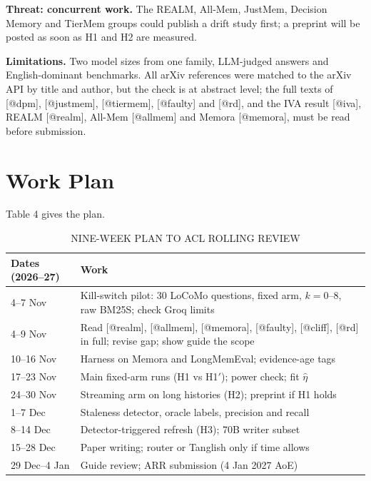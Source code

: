 \textbf{Threat: concurrent work.} The REALM, All-Mem, JustMem, Decision Memory and TierMem groups could publish a drift study first; a preprint will be posted as soon as H1 and H2 are measured.

\textbf{Limitations.} Two model sizes from one family, LLM-judged answers and English-dominant benchmarks. All arXiv references were matched to the arXiv API by title and author, but the check is at abstract level; the full texts of [@dpm], [@justmem], [@tiermem], [@faulty] and [@rd], and the IVA result [@iva], REALM [@realm], All-Mem [@allmem] and Memora [@memora], must be read before submission.

\section{Work Plan}

Table 4 gives the plan.

\begin{table}[H]
\centering
\caption{NINE-WEEK PLAN TO ACL ROLLING REVIEW}
\footnotesize\renewcommand{\arraystretch}{1.18}
\begin{tabularx}{\columnwidth}{|p{2.0cm}|X|}
\hline
\textbf{Dates (2026--27)} & \textbf{Work} \\ \hline
4--7 Nov & Kill-switch pilot: 30 LoCoMo questions, fixed arm, $k = 0$--$8$, raw BM25S; check Groq limits \\ \hline
4--9 Nov & Read [@realm], [@allmem], [@memora], [@faulty], [@cliff], [@rd] in full; revise gap; show guide the scope \\ \hline
10--16 Nov & Harness on Memora and LongMemEval; evidence-age tags \\ \hline
17--23 Nov & Main fixed-arm runs (H1 vs H1$'$); power check; fit $\hat\eta$ \\ \hline
24--30 Nov & Streaming arm on long histories (H2); preprint if H1 holds \\ \hline
1--7 Dec & Staleness detector, oracle labels, precision and recall \\ \hline
8--14 Dec & Detector-triggered refresh (H3); 70B writer subset \\ \hline
15--28 Dec & Paper writing; router or Tanglish only if time allows \\ \hline
29 Dec--4 Jan & Guide review; ARR submission (4 Jan 2027 AoE) \\ \hline
\end{tabularx}
\end{table}

